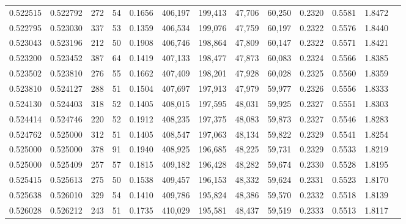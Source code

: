 \begin{tabular}{rrrrrrrrrrrrr}
0.522515 & 0.522792 &    272 &    54 &                                     0.1656 & 406,197 & 199,413 &  47,706 &  60,250 & 0.2320 & 0.5581 & 1.8472 \\
0.522795 & 0.523030 &    337 &    53 &                                     0.1359 & 406,534 & 199,076 &  47,759 &  60,197 & 0.2322 & 0.5576 & 1.8440 \\
0.523043 & 0.523196 &    212 &    50 &                                     0.1908 & 406,746 & 198,864 &  47,809 &  60,147 & 0.2322 & 0.5571 & 1.8421 \\
0.523200 & 0.523452 &    387 &    64 &                                     0.1419 & 407,133 & 198,477 &  47,873 &  60,083 & 0.2324 & 0.5566 & 1.8385 \\
0.523502 & 0.523810 &    276 &    55 &                                     0.1662 & 407,409 & 198,201 &  47,928 &  60,028 & 0.2325 & 0.5560 & 1.8359 \\
0.523810 & 0.524127 &    288 &    51 &                                     0.1504 & 407,697 & 197,913 &  47,979 &  59,977 & 0.2326 & 0.5556 & 1.8333 \\
0.524130 & 0.524403 &    318 &    52 &                                     0.1405 & 408,015 & 197,595 &  48,031 &  59,925 & 0.2327 & 0.5551 & 1.8303 \\
0.524414 & 0.524746 &    220 &    52 &                                     0.1912 & 408,235 & 197,375 &  48,083 &  59,873 & 0.2327 & 0.5546 & 1.8283 \\
0.524762 & 0.525000 &    312 &    51 &                                     0.1405 & 408,547 & 197,063 &  48,134 &  59,822 & 0.2329 & 0.5541 & 1.8254 \\
0.525000 & 0.525000 &    378 &    91 &                                     0.1940 & 408,925 & 196,685 &  48,225 &  59,731 & 0.2329 & 0.5533 & 1.8219 \\
0.525000 & 0.525409 &    257 &    57 &                                     0.1815 & 409,182 & 196,428 &  48,282 &  59,674 & 0.2330 & 0.5528 & 1.8195 \\
0.525415 & 0.525613 &    275 &    50 &                                     0.1538 & 409,457 & 196,153 &  48,332 &  59,624 & 0.2331 & 0.5523 & 1.8170 \\
0.525638 & 0.526010 &    329 &    54 &                                     0.1410 & 409,786 & 195,824 &  48,386 &  59,570 & 0.2332 & 0.5518 & 1.8139 \\
0.526028 & 0.526212 &    243 &    51 &                                     0.1735 & 410,029 & 195,581 &  48,437 &  59,519 & 0.2333 & 0.5513 & 1.8117 \\

\end{tabular}
